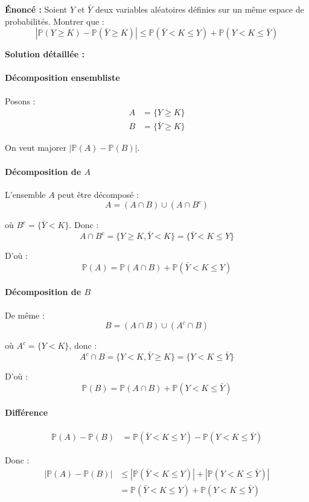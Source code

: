 \documentclass[12pt,a4paper]{article}
\theoremstyle{definition}
\theoremstyle{remark}
\newcommand{\Prob}{\mathbb{P}}
\begin{document}
\textbf{Énoncé :} Soient $Y$ et $\bar{Y}$ deux variables aléatoires définies sur un même espace de probabilités. Montrer que :
\[
|\Prob(Y \geq K) - \Prob(\bar{Y} \geq K)| \leq \Prob(\bar{Y} < K \leq Y) + \Prob(Y < K \leq \bar{Y})
\]

\textbf{Solution détaillée :}

\paragraph{Décomposition ensembliste}

Posons :
\begin{align*}
A &= \{Y \geq K\} \\
B &= \{\bar{Y} \geq K\}
\end{align*}

On veut majorer $|\Prob(A) - \Prob(B)|$.

\paragraph{Décomposition de $A$}

L'ensemble $A$ peut être décomposé :
\[
A = (A \cap B) \cup (A \cap B^c)
\]

où $B^c = \{\bar{Y} < K\}$. Donc :
\[
A \cap B^c = \{Y \geq K, \bar{Y} < K\} = \{\bar{Y} < K \leq Y\}
\]

D'où :
\[
\Prob(A) = \Prob(A \cap B) + \Prob(\bar{Y} < K \leq Y)
\]

\paragraph{Décomposition de $B$}

De même :
\[
B = (A \cap B) \cup (A^c \cap B)
\]

où $A^c = \{Y < K\}$, donc :
\[
A^c \cap B = \{Y < K, \bar{Y} \geq K\} = \{Y < K \leq \bar{Y}\}
\]

D'où :
\[
\Prob(B) = \Prob(A \cap B) + \Prob(Y < K \leq \bar{Y})
\]

\paragraph{Différence}

\begin{align*}
\Prob(A) - \Prob(B) &= \Prob(\bar{Y} < K \leq Y) - \Prob(Y < K \leq \bar{Y})
\end{align*}

Donc :
\begin{align*}
|\Prob(A) - \Prob(B)| &\leq |\Prob(\bar{Y} < K \leq Y)| + |\Prob(Y < K \leq \bar{Y})| \\
&= \Prob(\bar{Y} < K \leq Y) + \Prob(Y < K \leq \bar{Y})
\end{align*}
\end{document}
